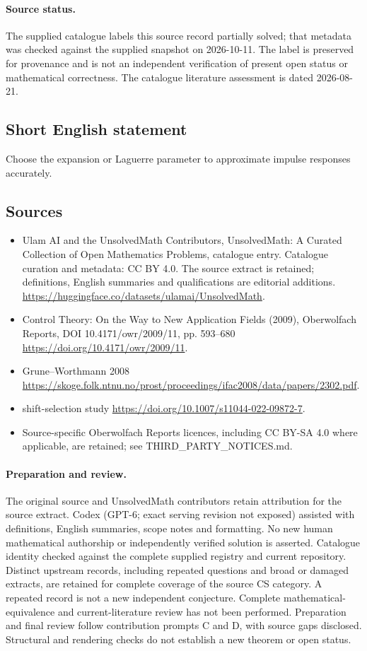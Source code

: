 \documentclass[11pt]{article}
\begin{document}
\paragraph{Source status.}
The supplied catalogue labels this source record partially solved; that metadata was checked against the supplied snapshot on 2026-10-11. The label is preserved for provenance and is not an independent verification of present open status or mathematical correctness. The catalogue literature assessment is dated 2026-08-21.
\subsection{Short English statement}
Choose the expansion or Laguerre parameter to approximate impulse responses accurately.
\subsection{Sources}
\begin{itemize}
\item[S1] Ulam AI and the UnsolvedMath Contributors, UnsolvedMath: A Curated Collection of Open Mathematics Problems, catalogue entry. Catalogue curation and metadata: CC BY 4.0. The source extract is retained; definitions, English summaries and qualifications are editorial additions.
\url{https://huggingface.co/datasets/ulamai/UnsolvedMath}.
\item[S2] Control Theory: On the Way to New Application Fields (2009), Oberwolfach Reports, DOI 10.4171/owr/2009/11, pp. 593--680
\url{https://doi.org/10.4171/owr/2009/11}.
\item[S3] Grune--Worthmann 2008
\url{https://skoge.folk.ntnu.no/prost/proceedings/ifac2008/data/papers/2302.pdf}.
\item[S4] shift-selection study
\url{https://doi.org/10.1007/s11044-022-09872-7}.
\item Source-specific Oberwolfach Reports licences, including CC BY-SA 4.0 where applicable, are retained; see THIRD\_PARTY\_NOTICES.md.
\end{itemize}
\paragraph{Preparation and review.}
The original source and UnsolvedMath contributors retain attribution for the source extract. Codex (GPT-6; exact serving revision not exposed) assisted with definitions, English summaries, scope notes and formatting. No new human mathematical authorship or independently verified solution is asserted. Catalogue identity checked against the complete supplied registry and current repository. Distinct upstream records, including repeated questions and broad or damaged extracts, are retained for complete coverage of the source CS category. A repeated record is not a new independent conjecture. Complete mathematical-equivalence and current-literature review has not been performed. Preparation and final review follow contribution prompts C and D, with source gaps disclosed. Structural and rendering checks do not establish a new theorem or open status.
\label{end:statement}
\end{document}
